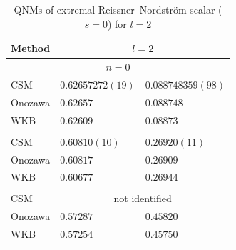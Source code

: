 \begin{table}[htbp]
\centering
\caption{QNMs of extremal Reissner--Nordstr\"om scalar ($s=0$) for $l=0$ and $l=1$}
\label{src:2604_20442:tab:result_rn0}
\end{table}
\begin{table}[htbp]
\centering
\caption{QNMs of extremal Reissner--Nordstr\"om scalar ($s=0$) for $l=2$}
\label{src:2604_20442:tab:result_rn0_2}
\begin{tabular}{l
                l@{$-\rmi$}l}
\toprule
Method & \multicolumn{2}{c}{$l=2$} \\
\midrule
\multicolumn{3}{c}{$n=0$} \\
CSM     & $0.62657272(19)$ & $0.088748359(98)$ \\
Onozawa & $0.62657$     & $0.088748$ \\
WKB     & $0.62609$     & $0.08873$ \\
\addlinespace
\multicolumn{3}{c}{$n=1$} \\
CSM     & $0.60810(10)$   & $0.26920(11)$ \\
Onozawa & $0.60817$     & $0.26909$ \\
WKB     & $0.60677$     & $0.26944$ \\
\addlinespace
\multicolumn{3}{c}{$n=2$} \\
CSM     & \multicolumn{2}{c}{not identified} \\
Onozawa & $0.57287$  & $0.45820$ \\
WKB     & $0.57254$  & $0.45750$ \\
\bottomrule
\end{tabular}
\end{table}
